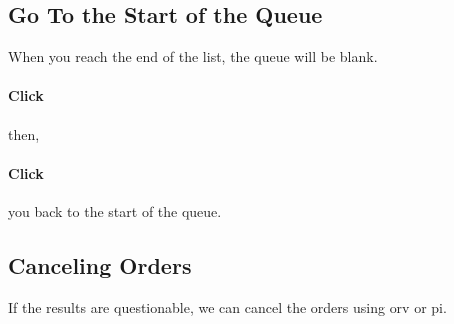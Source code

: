 \subsection{Go To the Start of the Queue}

When you reach the end of the list, the queue will be blank.

\paragraph{Click}  then,

\paragraph{Click} 

 you back to the start of the queue.


\subsection{Canceling Orders}

If the results are questionable, we can cancel the orders using \gls{orv} or \gls{pi}.

